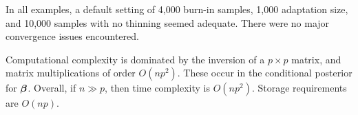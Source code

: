 In all examples, a default setting of 4,000 burn-in samples, 1,000 adaptation size, and 10,000 samples with no thinning seemed adequate.
There were no major convergence issues encountered.

Computational complexity is dominated by the inversion of a $p \times p$ matrix, and matrix multiplications of order $O(np^2)$.
These occur in the conditional posterior for ${\bm\beta}$.
Overall, if $n \gg p$, then time complexity is $O(np^2)$.
Storage requirements are $O(np)$.
